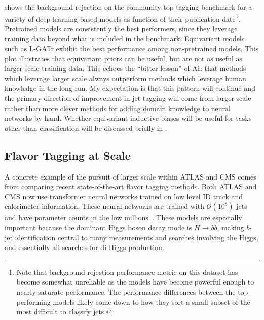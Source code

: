  shows the background rejection on the community top tagging benchmark for a variety of deep learning based models as function of their publication date\footnote{Note that background rejection performance metric on this dataset has become somewhat unreliable as the models have become powerful enough to nearly saturate performance. The performance differences between the top-performing models likely come down to how they sort a small subset of the most difficult to classify jets.}.
Pretrained models are consistently the best performers, since they leverage training data beyond what is included in the benchmark.
Equivariant models such as L-GATr exhibit the best performance among non-pretrained models.
This plot illustrates that equivariant priors can be useful, but are not as useful as larger scale training data.
This echoes the ``bitter lesson'' of AI: that methods which leverage larger scale always outperform methods which leverage human knowledge in the long run.
My expectation is that this pattern will continue and the primary direction of improvement in jet tagging will come from larger scale rather than more clever methods for adding domain knowledge to neural networks by hand.
Whether equivariant inductive biases will be useful for tasks other than classification will be discussed briefly in .

\subsection{Flavor Tagging at Scale}

A concrete example of the pursuit of larger scale within ATLAS and CMS comes from comparing recent state-of-the-art flavor tagging methods.
Both ATLAS and CMS now use transformer neural networks trained on low level ID track and calorimeter information.
These neural networks are trained with $\mathcal{O}(10^8)$ jets and have parameter counts in the low millions~\cite{ATLAS:2025dkv, Sarkar:2024vjz}.
These models are especially important because the dominant Higgs boson decay mode is $H \to b\bar{b}$, making $b$-jet identification central to many measurements and searches involving the Higgs, and essentially all searches for di-Higgs production.


